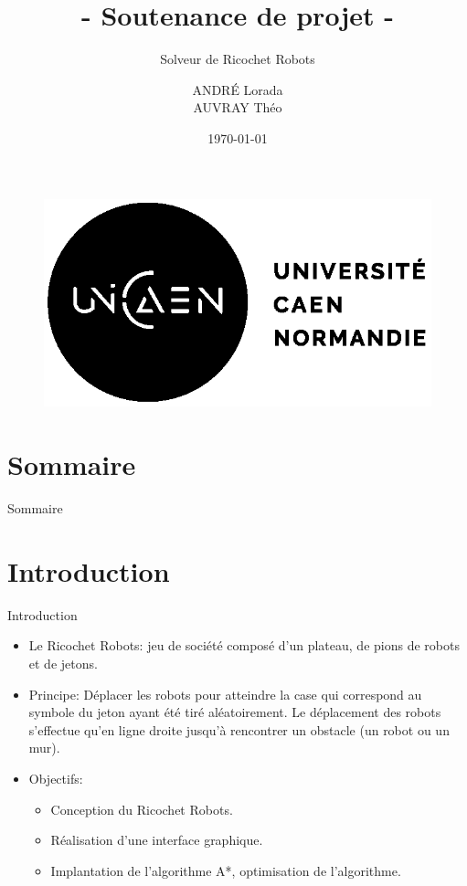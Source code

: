\documentclass{beamer}
\title{- Soutenance de projet -  }
\subtitle{Solveur de Ricochet Robots}
\author{ANDRÉ Lorada  \\ AUVRAY Théo}
\institute{L2 Informatique \\ Groupe 1A}
\date{\today}
\begin{document}
\begin{frame}
	\begin{figure}
        \includegraphics[scale=0.5]{images/logo.png}
	\end{figure}
	\titlepage
\end{frame}
\section{Sommaire}
    \begin{frame}{Sommaire}
        \tableofcontents
    \end{frame}
\section{Introduction}
    \begin{frame}{Introduction}
        \begin{itemize}
            \item Le Ricochet Robots: jeu de société composé d'un plateau, de pions de robots et de jetons. 
            \vspace{0.25cm}
            \item Principe: Déplacer les robots pour atteindre la case qui correspond au symbole du jeton ayant été tiré aléatoirement. Le déplacement des robots s'effectue qu'en ligne droite jusqu'à rencontrer un obstacle (un robot ou un mur).
            
            \vspace{0.25cm}
            
            \item Objectifs: 
            \begin{itemize}
                \item Conception du Ricochet Robots.
                \item Réalisation d'une interface graphique.
                \item Implantation de l'algorithme A*, optimisation de l'algorithme.
            \end{itemize}
        \end{itemize}
    \end{frame}
\end{document}
